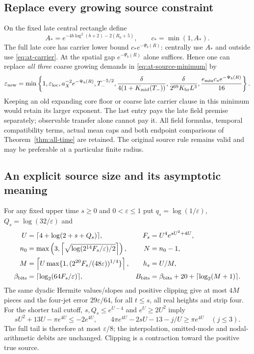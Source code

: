 \subsection{Replace every growing source constraint}
On the fixed late central rectangle define
\[
 A_*=e^{-4b\log^2(b+2)-2(R_0+5)},\qquad c_*=\min(1,A_*).
\]
The full late core has carrier lower bound $c_*e^{-\Psi_b(R)}$:
centrally use $A_*$ and outside use \eqref{eq:at-carrier}.
At the spatial gap $e^{-\Psi_b(R)}$ alone suffices. Hence one can
replace \emph{all three} coarse growing demands in
\eqref{eq:at-source-minimum} by
\begin{equation}
 \varepsilon_{\rm new}=\min\left\{1,\varepsilon_{\rm loc},
 a_X^{-2}e^{-\Psi_b(R)},T_-^{-5/2},
 \frac{\delta}{4(1+K_{\rm mid}(T_-))},
 \frac{\delta}{2^{69}K_{\rm br}L^3},
 \frac{e_{\min}c_*e^{-\Psi_b(R)}}{16}\right\}.
 \label{eq:sc-all-source}
\end{equation}
Keeping an old expanding core floor or coarse late carrier clause in
this minimum would retain its larger exponent. The last entry pays the
late field premise separately; observable transfer alone cannot pay it.
All field formulas, temporal compatibility terms, actual mean caps and
both endpoint comparisons of Theorem~\ref{thm:all-time} are retained.
The original source rule remains valid and may be preferable at a
particular finite radius.

\subsection{An explicit source size and its asymptotic meaning}
For any fixed upper time $s\ge0$ and $0<\varepsilon\le1$ put
$q_s=\log(1/\varepsilon)$, $Q_s=\log(32/\varepsilon)$ and
\begin{align}
 U&=\lceil4+\log(2+s+Q_s)\rceil,& F_s&=U^4e^{sU^2+4U},\notag\\
 n_0&=\max\left(3,\left\lceil\sqrt{\log(2^{14}F_s/\varepsilon)/2}\right\rceil\right),
 &N&=n_0-1,\notag\\
 M&=\left\lceil U\max\{1,(2^{20}F_s/(48\varepsilon))^{1/4}\}\right\rceil,
 &h_s&=U/M,\notag\\
 \beta_{\rm bits}&=\lceil\log_2(64F_s/\varepsilon)\rceil,
 &B_{\rm bits}&=\beta_{\rm bits}+20+\lceil\log_2(M+1)\rceil.
 \label{eq:sc-constructor}
\end{align}
The same dyadic Hermite values/slopes and positive clipping give at most
$4M$ pieces and the four-jet error $29\varepsilon/64$, for all $t\le s$,
all real heights and strip four. For the shorter tail cutoff,
$s,Q_s\le e^{U-4}$ and $e^U\ge2U^2$ imply
\[
 sU^2+13U-\pi e^{4U}\le-2e^{4U},\qquad
 4\pi e^{4U}-2sU-13-j/U\ge\pi e^{4U}\quad(j\le3).
\]
The full tail is therefore at most $\varepsilon/8$; the interpolation,
omitted-mode and nodal-arithmetic debits are unchanged. Clipping is a
contraction toward the positive true source.

